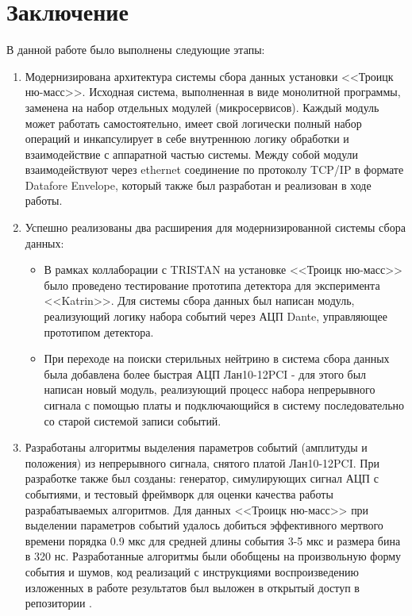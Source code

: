 \documentclass[a4paper,14pt]{extreport}
\begin{document}
\chapter*{Заключение}
В данной работе было выполнены следующие этапы:
\begin{enumerate}
    \item Модернизирована архитектура системы сбора данных установки <<Троицк ню-масс>>. Исходная система, выполненная в виде монолитной программы, заменена на набор отдельных модулей (микросервисов). Каждый модуль может работать самостоятельно, имеет свой логически полный набор операций и инкапсулирует в себе внутреннюю логику обработки и взаимодействие с аппаратной частью системы. Между собой модули взаимодействуют через ethernet соединение по протоколу TCP/IP в формате Datafore Envelope, который также был разработан и реализован в ходе работы.
    \item Успешно реализованы два расширения для модернизированной системы сбора данных:
    \begin{itemize}
        \item В рамках коллаборации с TRISTAN на установке <<Троицк ню-масс>> было проведено тестирование прототипа детектора для эксперимента <<Katrin>>. Для системы сбора данных был написан модуль, реализующий логику набора событий через АЦП Dante, управляющее прототипом детектора.
        \item При переходе на поиски стерильных нейтрино в система сбора данных была добавлена более быстрая АЦП Лан10-12PCI - для этого был написан новый модуль, реализующий процесс набора непрерывного сигнала с помощью платы и подключающийся в систему последовательно со старой системой записи событий.
    \end{itemize}
    \item Разработаны алгоритмы выделения параметров событий (амплитуды и положения) из непрерывного сигнала, снятого платой Лан10-12PCI. При разработке также был созданы: генератор, симулирующих сигнал АЦП с событиями, и тестовый фреймворк для оценки качества работы разрабатываемых алгоритмов. Для данных <<Троицк ню-масс>> при выделении параметров событий удалось добиться эффективного мертвого времени порядка 0.9 мкс для средней длины события 3-5 мкс и размера бина в 320 нс. Разработанные алгоритмы были обобщены на произвольную форму события и шумов, код реализаций с инструкциями воспроизведению изложенных в работе результатов был выложен в открытый доступ в репозитории \cite{signal-utils}\cite{lan10-processing}.
\end{enumerate}

\printbibliography
\end{document}

